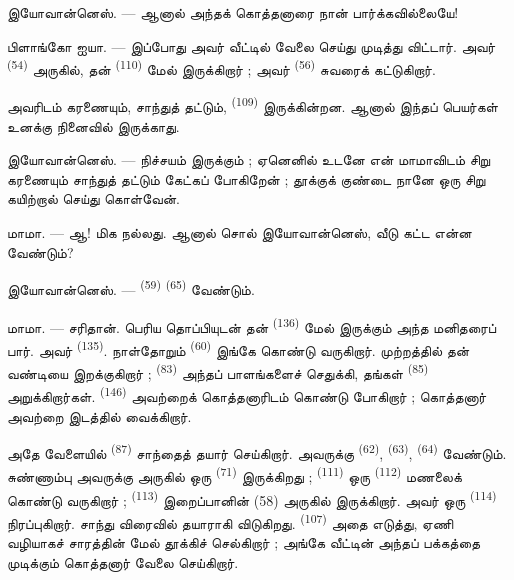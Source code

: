 \textsc{இயோவான்னெஸ்}. --- ஆனால் அந்தக் கொத்தனாரை நான் பார்க்கவில்லையே!

\textsc{பிளாங்கோ ஐயா}. --- இப்போது அவர் வீட்டில் வேலை செய்து முடித்து
விட்டார். அவர்  \textsuperscript{(54)} அருகில்,
தன்  \textsuperscript{(110)} மேல் இருக்கிறார் ; அவர்
 \textsuperscript{(56)} சுவரைக் கட்டுகிறார்.

அவரிடம் கரணையும், சாந்துத் தட்டும், 
\textsuperscript{(109)} இருக்கின்றன. ஆனால் இந்தப் பெயர்கள் உனக்கு நினைவில்
இருக்காது.

\textsc{இயோவான்னெஸ்}. --- நிச்சயம் இருக்கும் ; ஏனெனில் உடனே என் மாமாவிடம்
சிறு கரணையும் சாந்துத் தட்டும் கேட்கப் போகிறேன் ; தூக்குக் குண்டை நானே
ஒரு சிறு கயிற்றால் செய்து கொள்வேன்.

\VUsaut{3.0mm}
\VUsaut{3.0mm}

\textsc{மாமா}. --- ஆ! மிக நல்லது. ஆனால் சொல் இயோவான்னெஸ், வீடு கட்ட
என்ன வேண்டும்?

\textsc{இயோவான்னெஸ்}. ---  \textsuperscript{(59)}
 \textsuperscript{(65)} வேண்டும்.

\textsc{மாமா}. --- சரிதான். பெரிய தொப்பியுடன் தன் 
\textsuperscript{(136)} மேல் இருக்கும் அந்த மனிதரைப் பார். அவர்
 \textsuperscript{(135)}. நாள்தோறும் 
\textsuperscript{(60)} இங்கே கொண்டு வருகிறார். முற்றத்தில் தன் வண்டியை
இறக்குகிறார் ;  \textsuperscript{(83)} அந்தப்
பாளங்களைச் செதுக்கி, தங்கள்  \textsuperscript{(85)}
அறுக்கிறார்கள்.  \textsuperscript{(146)} அவற்றைக்
கொத்தனாரிடம் கொண்டு போகிறார் ; கொத்தனார் அவற்றை இடத்தில் வைக்கிறார்.

அதே வேளையில்  \textsuperscript{(87)} சாந்தைத் தயார்
செய்கிறார். அவருக்கு  \textsuperscript{(62)},
 \textsuperscript{(63)}, 
\textsuperscript{(64)} வேண்டும். சுண்ணாம்பு அவருக்கு அருகில் ஒரு
 \textsuperscript{(71)} இருக்கிறது ;
 \textsuperscript{(111)} ஒரு
 \textsuperscript{(112)} மணலைக் கொண்டு வருகிறார் ;
 \textsuperscript{(113)} இறைப்பானின் (58) அருகில்
இருக்கிறார். அவர் ஒரு  \textsuperscript{(114)}
நிரப்புகிறார். சாந்து விரைவில் தயாராகி விடுகிறது.
 \textsuperscript{(107)} அதை எடுத்து, ஏணி வழியாகச்
சாரத்தின் மேல் தூக்கிச் செல்கிறார் ; அங்கே வீட்டின் அந்தப் பக்கத்தை
முடிக்கும் கொத்தனார் வேலை செய்கிறார்.


